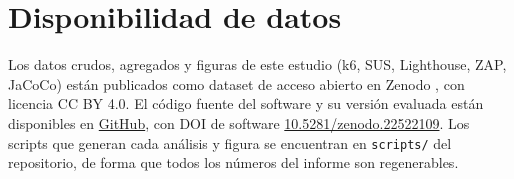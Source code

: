 \documentclass[11pt,a4paper]{report}
\begin{document}
\tableofcontents
\clearpage


\clearpage

\clearpage

\clearpage

\clearpage



\clearpage
\section*{Disponibilidad de datos}

Los datos crudos, agregados y figuras de este estudio (k6, SUS, Lighthouse, ZAP,
JaCoCo) están publicados como dataset de acceso abierto en Zenodo
\cite{dataset_sgroas}, con licencia CC BY 4.0. El código fuente del software y
su versión evaluada están disponibles en
\href{https://github.com/Alxjandr07/SGROAS-ProyectoAppWeb}{GitHub}, con DOI de
software \href{https://doi.org/10.5281/zenodo.22522109}{10.5281/zenodo.22522109}.
Los scripts que generan cada análisis y figura se encuentran en
\texttt{scripts/} del repositorio, de forma que todos los números del informe
son regenerables.

\clearpage
\printbibliography[title={Referencias}]

\nocite{*}
\end{document}
